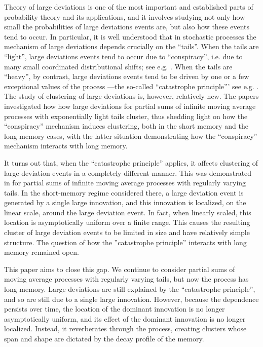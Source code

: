\documentclass[11pt,reqno]{amsart}
\numberwithin{equation}{section}
\theoremstyle{definition}
\theoremstyle{remark}
\theoremstyle{definition}
\begin{document}
Theory of large deviations is one of the most important and
established parts of probability theory and its applications, and it
involves studying not only how small the probabilities of large
deviations events are, but also how these events tend to occur. In
particular, it is well understood  that in stochastic
processes the mechanism of large 
deviations depends crucially on the ``tails''. When the tails are
``light'', large deviations events tend to occur due to
``conspiracy'', i.e. due to many small   coordinated distributional
shifts; see e.g. \cite{dembo:zeitouni:1998,
  deuschel:stroock:1989}. When the tails are ``heavy'',  by contrast,
large deviations events tend to be  driven by one or a few exceptional
values of the process —the so-called ``catastrophe principle''' see
e.g. \cite{denisov:dieker:shneer:2008, mikosch:winterberger:2013}. The 
study of clustering of large deviations is, however, relatively
new. The papers \cite{chakrabarty:samorodnitsky:2024,
  chakrabarty:samorodnitsky:2023} investigated how how large
deviations for partial sums of infinite moving average processes with
exponentially light tails cluster, thus shedding light on how the 
``conspiracy'' mechanism induces clustering, both in the short memory
and the long memory cases, with the latter situation demonstrating how the 
``conspiracy'' mechanism interacts with long memory. 

It turns out that, when the ``catastrophe principle'' applies, it
affects clustering of large deviation events in a completely different
manner. This was demonstrated in \cite{wang:samorodnitsky:2025} for
partial sums of infinite moving average processes with regularly
varying tails. In the short-memory regime considered there,
  a large deviation event is generated by a single large innovation,
  and this innovation is localized, on the linear scale, around the
  large deviation event. In fact, when linearly scaled, this 
location is asymptotically uniform over a finite range.  This causes 
 the resulting cluster of large deviation events to be limited in size
 and have relatively simple structure. The question of how the
 ''catastrophe principle'' interacts with long memory remained open. 

This paper aims to close this gap. We continue to consider partial
sums of moving average processes with regularly varying tails, but now
the process has long  memory. Large deviations are still 
explained by the ``catastrophe principle'', and so are still due to 
a single large innovation. However, because the dependence persists
over time,  the location  of the  dominant innovation is no longer
asymptotically uniform, and its effect of the  dominant innovation is
no longer localized. Instead, it reverberates through 
the process, creating clusters  whose span and shape are dictated by
the decay profile of the memory. 
\end{document}
